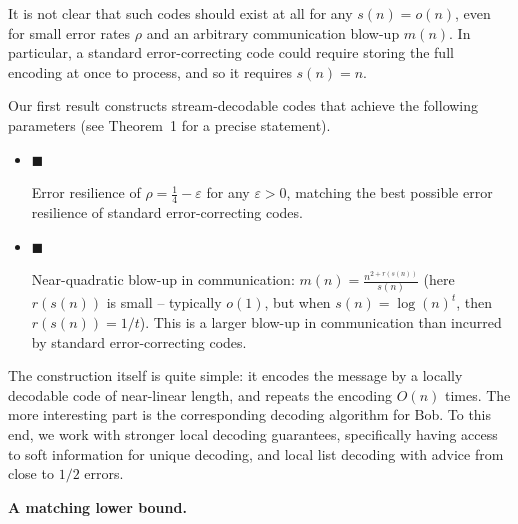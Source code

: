 \documentclass[10pt,a4paper]{article}
\begin{document}
It is not clear that such codes should exist at all for any $s(n)=o(n)$, even for small error rates $\rho$ and an arbitrary communication blow-up $m(n)$. In particular, a standard error-correcting code could require storing the full encoding at once to process, and so it requires $s(n)=n$.\par




Our first result constructs stream-decodable codes that achieve the following parameters (see Theorem 1 for a precise statement).\par


\begin{itemize}


\item[] 
$\blacksquare$ 


Error resilience of $\rho=\frac{1}{4}-\varepsilon$ for any $\varepsilon>0$, matching the best possible error resilience of standard error-correcting codes.\par





\item[] 
$\blacksquare$ 


Near-quadratic blow-up in communication: $m(n)=\frac{n^{2+r(s(n))}}{s(n)}$ (here $r(s(n))$ is small – typically $o(1)$, but when $s(n)=\log(n)^{t}$, then $r(s(n))=1/t$). This is a larger blow-up in communication than incurred by standard error-correcting codes.\par





\end{itemize}


The construction itself is quite simple: it encodes the message by a locally decodable code of near-linear length, and repeats the encoding $O(n)$ times. The more interesting part is the corresponding decoding algorithm for Bob. To this end, we work with stronger local decoding guarantees, specifically having access to soft information for unique decoding, and local list decoding with advice from close to $1/2$ errors.\par





\par\medskip\noindent\textbf{A matching lower bound.}\par
\end{document}
